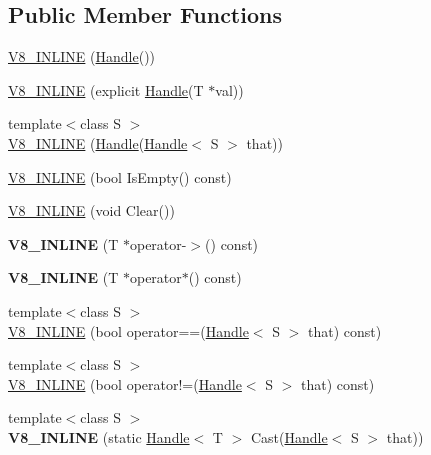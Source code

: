 \subsection*{Public Member Functions}
\begin{DoxyCompactItemize}
\item 
\hyperlink{classv8_1_1_handle_a0005cb917206b7e4800d19d4eca68e21}{V8\+\_\+\+I\+N\+L\+I\+N\+E} (\hyperlink{classv8_1_1_handle}{Handle}())
\item 
\hyperlink{classv8_1_1_handle_a1e20fd64391338cda4daabd6dcb569e8}{V8\+\_\+\+I\+N\+L\+I\+N\+E} (explicit \hyperlink{classv8_1_1_handle}{Handle}(T $\ast$val))
\item 
{\footnotesize template$<$class S $>$ }\\\hyperlink{classv8_1_1_handle_a947012938048fb8159ccdeb63b3e6a0f}{V8\+\_\+\+I\+N\+L\+I\+N\+E} (\hyperlink{classv8_1_1_handle}{Handle}(\hyperlink{classv8_1_1_handle}{Handle}$<$ S $>$ that))
\item 
\hyperlink{classv8_1_1_handle_a77848ecb0ef455dfd0d6c70b469f44d9}{V8\+\_\+\+I\+N\+L\+I\+N\+E} (bool Is\+Empty() const)
\item 
\hyperlink{classv8_1_1_handle_ad2464f7c221a91e14caa0343312e36f9}{V8\+\_\+\+I\+N\+L\+I\+N\+E} (void Clear())
\item 
\hypertarget{classv8_1_1_handle_ad0580b75ccf7af4cfb74b5e5c1bfb2fd}{}{\bfseries V8\+\_\+\+I\+N\+L\+I\+N\+E} (T $\ast$operator-\/$>$() const)\label{classv8_1_1_handle_ad0580b75ccf7af4cfb74b5e5c1bfb2fd}

\item 
\hypertarget{classv8_1_1_handle_aad1d16e28c0e6941172dc9dd24d3617a}{}{\bfseries V8\+\_\+\+I\+N\+L\+I\+N\+E} (T $\ast$operator$\ast$() const)\label{classv8_1_1_handle_aad1d16e28c0e6941172dc9dd24d3617a}

\item 
{\footnotesize template$<$class S $>$ }\\\hyperlink{classv8_1_1_handle_abd3168074b63e88cc07d8451e177027f}{V8\+\_\+\+I\+N\+L\+I\+N\+E} (bool operator==(\hyperlink{classv8_1_1_handle}{Handle}$<$ S $>$ that) const)
\item 
{\footnotesize template$<$class S $>$ }\\\hyperlink{classv8_1_1_handle_a85f5fb0108672950759ccc99cc8348a8}{V8\+\_\+\+I\+N\+L\+I\+N\+E} (bool operator!=(\hyperlink{classv8_1_1_handle}{Handle}$<$ S $>$ that) const)
\item 
\hypertarget{classv8_1_1_handle_a7a264b2c3e58c4003f5968a7c0ef347e}{}{\footnotesize template$<$class S $>$ }\\{\bfseries V8\+\_\+\+I\+N\+L\+I\+N\+E} (static \hyperlink{classv8_1_1_handle}{Handle}$<$ T $>$ Cast(\hyperlink{classv8_1_1_handle}{Handle}$<$ S $>$ that))\label{classv8_1_1_handle_a7a264b2c3e58c4003f5968a7c0ef347e}


\end{DoxyCompactItemize}
